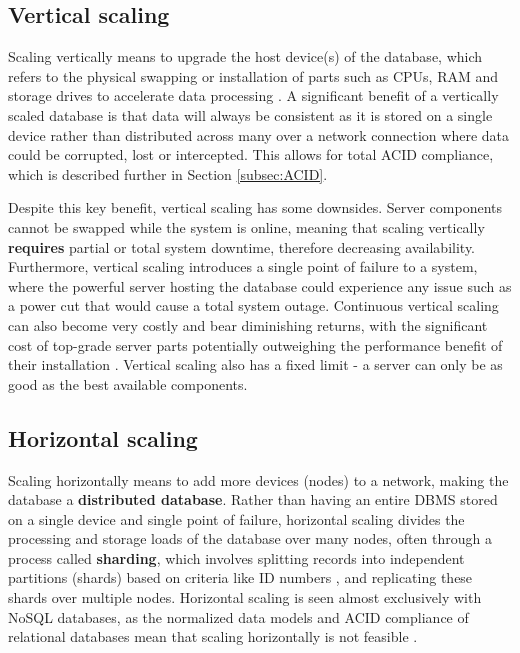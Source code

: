 \subsection{Vertical scaling}
Scaling vertically means to upgrade the host device(s) of the database, which refers to the physical swapping or installation of 
parts such as CPUs, RAM and storage drives to accelerate data processing \autocite{cattellScalableSQLNoSQL2011}. 
A significant benefit of a vertically scaled database is that data will always be consistent as it is stored on a single device rather than
distributed across many over a network connection where data could be corrupted, lost or intercepted. This allows for total ACID compliance, which is described further in Section \ref{subsec:ACID}. 

\para Despite this key benefit, vertical scaling has some downsides. Server components cannot be swapped while the system is online, meaning 
that scaling vertically \textbf{requires} partial or total system downtime, therefore decreasing availability. Furthermore, vertical scaling 
introduces a single point of failure to a system, where the powerful server hosting the database could experience any issue such as a power cut 
that would cause a total system outage. Continuous vertical scaling can also become very costly and bear diminishing returns, with the 
significant cost of top-grade server parts potentially outweighing the performance benefit of their installation 
\autocite{mongodbGuideHorizontalVs}. Vertical scaling also has a fixed limit - a server can only be as good as the best available components.


\subsection{Horizontal scaling}

Scaling horizontally means to add more devices (nodes) to a network, making the database a \textbf{distributed database}. Rather 
than having an entire DBMS stored on a single device and single point of failure, horizontal scaling divides the processing and storage 
loads of the database over many nodes, often through a process called \textbf{sharding}, which involves splitting records into independent 
partitions (shards) based on criteria like ID numbers \autocite{corbelliniPersistingBigdataNoSQL2017}, and replicating these shards over multiple 
nodes. Horizontal scaling is seen almost exclusively with NoSQL databases, as the normalized data models and ACID compliance of relational 
databases mean that scaling horizontally is not feasible \autocite{hechtNoSQLEvaluationUse2011}. 

